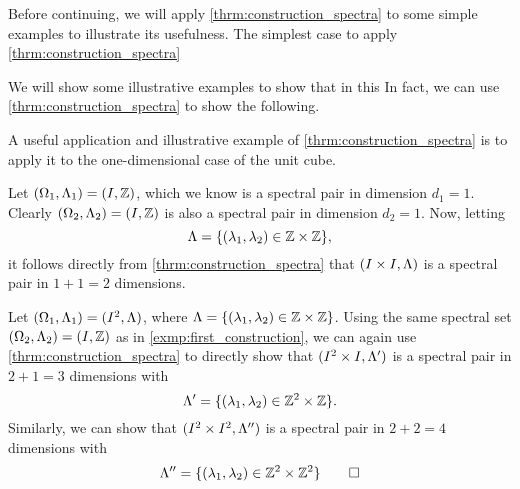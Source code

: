 \documentclass[../thesis.tex]{subfiles}
\begin{document}
Before continuing, we will apply \cref{thrm:construction_spectra} to some simple examples to illustrate its usefulness.
The simplest case to apply \cref{thrm:construction_spectra}

We will show some illustrative examples to show that in this
In fact, we can use \cref{thrm:construction_spectra} to show the following. 

A useful application and illustrative example of \cref{thrm:construction_spectra} is to apply it to the one-dimensional case of the unit cube.

\begin{example}\label{exmp:first_construction}
    Let $(\Omega_1,\Lambda_1)=(I, \mathbb{Z})$, which we know is a spectral pair in dimension $d_1=1$. Clearly $(\Omega_2,\Lambda_2) = (I, \mathbb{Z})$ is also a spectral pair in dimension $d_2=1$. Now, letting 
    \begin{equation*}
        \Lambda  = \{(\lambda_1,\lambda_2)\in \mathbb{Z} \times \mathbb{Z} \},
    \end{equation*}
    it follows directly from \cref{thrm:construction_spectra} that $(I \times I, \Lambda)$ is a spectral pair in $1+1=2$ dimensions.
\end{example}


\begin{example}\label{exmp:second_construction}
    Let $(\Omega_1,\Lambda_1) = (I^2, \Lambda)$, where $\Lambda  = \{(\lambda_1,\lambda_2)\in \mathbb{Z} \times \mathbb{Z} \}$.
    Using the same spectral set $(\Omega_2,\Lambda_2) = (I, \mathbb{Z})$ as in \cref{exmp:first_construction}, we can again use \cref{thrm:construction_spectra} to directly show that $(I^2 \times I, \Lambda')$ is a spectral pair in $2+1=3$ dimensions with 
    \begin{equation*}
        \Lambda'=\{(\lambda_1,\lambda_2)\in \mathbb{Z}^2 \times \mathbb{Z}\}.
    \end{equation*}
    Similarly, we can show that $(I^2 \times I^2, \Lambda'')$ is a spectral pair in $2+2=4$ dimensions with
    \begin{equation*}
        \Lambda''=\{(\lambda_1,\lambda_2)\in \mathbb{Z}^2 \times \mathbb{Z}^2\} \qedhere
    \end{equation*}
\end{example}
\end{document}
